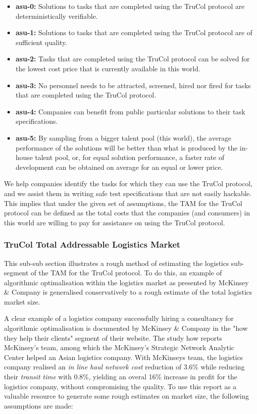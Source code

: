 \begin{itemize}
	\item \textbf{asu-0:} Solutions to tasks that are completed using the TruCol protocol are deterministically verifiable.
	\item \textbf{asu-1:} Solutions to tasks that are completed using the TruCol protocol are of sufficient quality.
	\item \textbf{asu-2:} Tasks that are completed using the TruCol protocol can be solved for the lowest cost price that is currently available in this world.
	\item \textbf{asu-3:} No personnel needs to be attracted, screened, hired nor fired for tasks that are completed using the TruCol protocol.
	\item \textbf{asu-4:} Companies can benefit from public particular solutions to their task specifications. 
	\item \textbf{asu-5:} By sampling from a bigger talent pool (this world), the average performance of the solutions will be better than what is produced by the in-house talent pool, or, for equal solution performance, a faster rate of development can be obtained on average for an equal or lower price.
\end{itemize}



We help companies identify the tasks for which they can use the TruCol protocol, and we assist them in writing safe test specifications that are not easily hackable. This implies that under the given set of assumptions, the TAM for the TruCol protocol can be defined as the total costs that the companies (and consumers) in this world are willing to pay for assistance on using the TruCol protocol. 

\subsubsection{TruCol Total Addressable Logistics Market}\label{subsubsec:tam_logistics}

This sub-sub section illustrates a rough method of estimating the logistics sub-segment of the TAM for the TruCol protocol. To do this, an example of algorithmic optimalisation within the logistics market as presented by McKinsey \& Company is generalised conservatively to a rough estimate of the total logistics market size.

A clear example of a logistics company successfully hiring a consultancy for algorithmic optimalisation is documented by McKinsey \& Company in the "how they help their clients" segment of their website\cite{mckinsey_algo}. The study how reports McKinsey's team, among which the McKinsey's Strategic Network Analytic Center helped an Asian logistics company. With McKinseys team, the logistics company realised an \textit{in line haul network cost} reduction of 3.6\% while reducing their \textit{transit time} with 0.8\%, yielding an overal 16\% increase in profit for the logistics company, without compromising the quality. To use this report as a valuable resource to generate some rough estimates on market size, the following assumptions are made:


